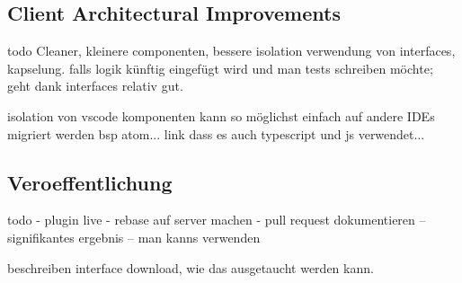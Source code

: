 \subsection{Client Architectural Improvements}
todo
Cleaner, kleinere componenten, bessere isolation
verwendung von interfaces, kapselung. falls logik künftig eingefügt wird und man tests schreiben möchte; geht dank interfaces relativ gut.

isolation von vscode komponenten
kann so möglichst einfach auf andere IDEs migriert werden
bsp atom... link dass es auch typescript und js verwendet...

\subsection{Veroeffentlichung}
todo
- plugin live
- rebase auf server machen
- pull request dokumentieren -- signifikantes ergebnis -- man kanns verwenden

beschreiben interface download, wie das ausgetaucht werden kann.
